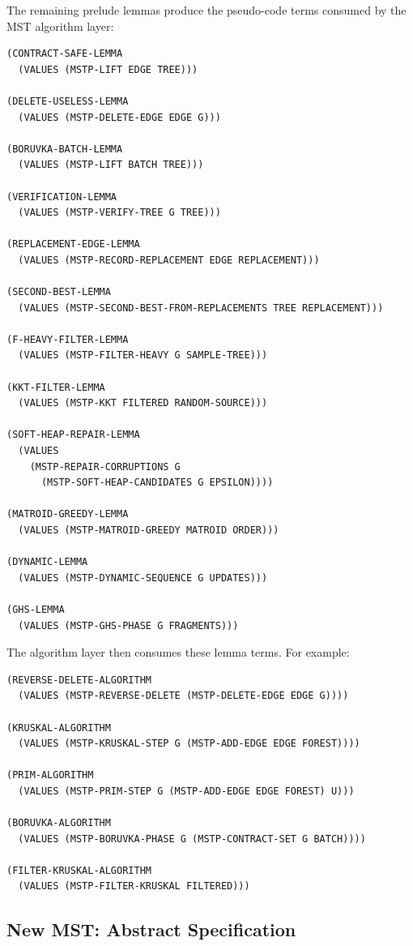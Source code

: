 \documentclass[runningheads]{llncs}
\begin{document}
The remaining prelude lemmas produce the pseudo-code terms consumed by the MST
algorithm layer:
\begin{lstlisting}
(CONTRACT-SAFE-LEMMA
  (VALUES (MSTP-LIFT EDGE TREE)))

(DELETE-USELESS-LEMMA
  (VALUES (MSTP-DELETE-EDGE EDGE G)))

(BORUVKA-BATCH-LEMMA
  (VALUES (MSTP-LIFT BATCH TREE)))

(VERIFICATION-LEMMA
  (VALUES (MSTP-VERIFY-TREE G TREE)))

(REPLACEMENT-EDGE-LEMMA
  (VALUES (MSTP-RECORD-REPLACEMENT EDGE REPLACEMENT)))

(SECOND-BEST-LEMMA
  (VALUES (MSTP-SECOND-BEST-FROM-REPLACEMENTS TREE REPLACEMENT)))

(F-HEAVY-FILTER-LEMMA
  (VALUES (MSTP-FILTER-HEAVY G SAMPLE-TREE)))

(KKT-FILTER-LEMMA
  (VALUES (MSTP-KKT FILTERED RANDOM-SOURCE)))

(SOFT-HEAP-REPAIR-LEMMA
  (VALUES
    (MSTP-REPAIR-CORRUPTIONS G
      (MSTP-SOFT-HEAP-CANDIDATES G EPSILON))))

(MATROID-GREEDY-LEMMA
  (VALUES (MSTP-MATROID-GREEDY MATROID ORDER)))

(DYNAMIC-LEMMA
  (VALUES (MSTP-DYNAMIC-SEQUENCE G UPDATES)))

(GHS-LEMMA
  (VALUES (MSTP-GHS-PHASE G FRAGMENTS)))
\end{lstlisting}
The algorithm layer then consumes these lemma terms.  For example:
\begin{lstlisting}
(REVERSE-DELETE-ALGORITHM
  (VALUES (MSTP-REVERSE-DELETE (MSTP-DELETE-EDGE EDGE G))))

(KRUSKAL-ALGORITHM
  (VALUES (MSTP-KRUSKAL-STEP G (MSTP-ADD-EDGE EDGE FOREST))))

(PRIM-ALGORITHM
  (VALUES (MSTP-PRIM-STEP G (MSTP-ADD-EDGE EDGE FOREST) U)))

(BORUVKA-ALGORITHM
  (VALUES (MSTP-BORUVKA-PHASE G (MSTP-CONTRACT-SET G BATCH))))

(FILTER-KRUSKAL-ALGORITHM
  (VALUES (MSTP-FILTER-KRUSKAL FILTERED)))
\end{lstlisting}

\subsection{New MST: Abstract Specification}
\end{document}
